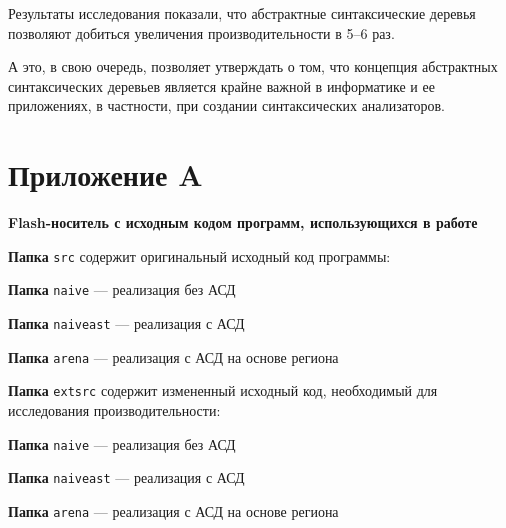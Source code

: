 \documentclass[coursework]{SCWorks}
\begin{document}
Результаты исследования показали, что абстрактные синтаксические деревья позволяют добиться увеличения производительности в 5–6 раз.

А это, в свою очередь, позволяет утверждать о том, что концепция абстрактных синтаксических деревьев является крайне важной в информатике и ее приложениях, в частности, при создании синтаксических анализаторов.

%

 \nocite{*}





\appendix

\section{Приложение A}
\label{appendA}
\begin{center}
\textbf{Flash-носитель с исходным кодом программ, использующихся в работе}
\end{center}
\textbf{Папка} \texttt{src} содержит оригинальный исходный код программы:
\begin{description}
	\item \textbf{Папка} \texttt{naive} — реализация без АСД
	\item \textbf{Папка} \texttt{naiveast} — реализация с АСД
	\item \textbf{Папка} \texttt{arena} — реализация с АСД на основе региона
\end{description}
\textbf{Папка} \texttt{extsrc} содержит измененный исходный код, необходимый для исследования производительности:
\begin{description}
	\item \textbf{Папка} \texttt{naive} — реализация без АСД
	\item \textbf{Папка} \texttt{naiveast} — реализация с АСД
	\item \textbf{Папка} \texttt{arena} — реализация с АСД на основе региона
\end{description}
%
\end{document}
